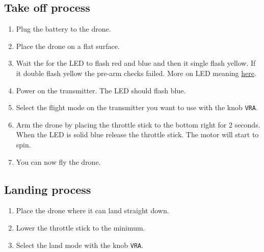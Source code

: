 \subsection{Take off process}
\begin{enumerate}
    \item Plug the battery to the drone.
    \item Place the drone on a flat surface.
    \item Wait the for the LED to flash red and blue and then it single flash yellow. If it double flash yellow the pre-arm checks failed. More on LED meaning \href{http://ardupilot.org/copter/docs/common-leds-pixhawk.html}{here}.
    \item Power on the transmitter. The LED should flash blue.
    \item Select the flight mode on the transmitter you want to use with the knob \texttt{VRA}.
    \item Arm the drone by placing the throttle stick to the bottom right for 2 seconds. When the LED is solid blue release the throttle stick. The motor will start to spin.
    \item You can now fly the drone.
\end{enumerate}

\subsection{Landing process}
\begin{enumerate}
    \item Place the drone where it can land straight down.
    \item Lower the throttle stick to the minimum.
    \item Select the land mode with the knob \texttt{VRA}.
\end{enumerate}
